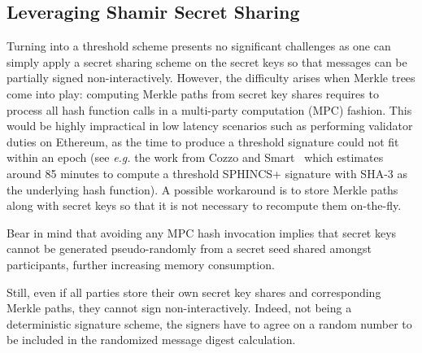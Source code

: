\subsection{Leveraging Shamir Secret Sharing}
Turning \WOTS into a threshold scheme presents no significant challenges as one can simply apply a secret sharing scheme on the secret keys so that messages can be partially signed non-interactively.
However, the difficulty arises when Merkle trees come into play: computing Merkle paths from secret key shares requires to process all hash function calls in a multi-party computation (MPC) fashion.
This would be highly impractical in low latency scenarios such as performing validator duties on Ethereum, as the time to produce a threshold signature could not fit within an epoch (see \textit{e.g.} the work from Cozzo and Smart~\cite{cryptoeprint:2019/1060} which estimates around 85 minutes to compute a threshold \textsf{SPHINCS+} signature with \textsf{SHA-3} as the underlying hash function).
A possible workaround is to store Merkle paths along with \WOTS secret keys so that it is not necessary to recompute them on-the-fly.



Bear in mind that avoiding any MPC hash invocation implies that \WOTS secret keys cannot be generated pseudo-randomly from a secret seed shared amongst participants, further increasing memory consumption.
 
Still, even if all parties store their own \WOTS secret key shares and corresponding Merkle paths, they cannot sign non-interactively.
Indeed, \XMSS not being a deterministic signature scheme, the signers have to agree on a random number to be included in the randomized message digest calculation.
